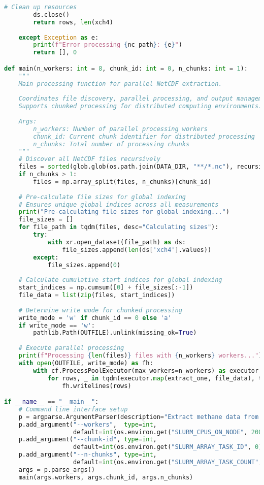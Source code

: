 \begin{lstlisting}[language=Python, caption=Parallel NetCDF Data Extraction Algorithm, label=alg:step01_extract, breaklines=true]
        # Clean up resources
        ds.close()
        return rows, len(xch4)
        
    except Exception as e:
        print(f"Error processing {nc_path}: {e}")
        return [], 0

def main(n_workers: int = 8, chunk_id: int = 0, n_chunks: int = 1):
    """
    Main processing function for parallel NetCDF extraction.
    
    Coordinates file discovery, parallel processing, and output management.
    Supports chunked processing for distributed computing environments.
    
    Args:
        n_workers: Number of parallel processing workers
        chunk_id: Current chunk identifier for distributed processing  
        n_chunks: Total number of processing chunks
    """
    # Discover all NetCDF files recursively
    files = sorted(glob.glob(os.path.join(DATA_DIR, "**/*.nc"), recursive=True))
    if n_chunks > 1:
        files = np.array_split(files, n_chunks)[chunk_id]
    
    # Pre-calculate file sizes for global indexing
    # Ensures unique global indices across all measurements
    print("Pre-calculating file sizes for global indexing...")
    file_sizes = []
    for file_path in tqdm(files, desc="Calculating sizes"):
        try:
            with xr.open_dataset(file_path) as ds:
                file_sizes.append(len(ds['xch4'].values))
        except:
            file_sizes.append(0)
    
    # Calculate cumulative start indices for global indexing
    start_indices = np.cumsum([0] + file_sizes[:-1])
    file_data = list(zip(files, start_indices))
    
    # Determine write mode for chunked processing
    write_mode = 'w' if chunk_id == 0 else 'a'
    if write_mode == 'w':
        pathlib.Path(OUTFILE).unlink(missing_ok=True)
    
    # Execute parallel processing
    print(f"Processing {len(files)} files with {n_workers} workers...")
    with open(OUTFILE, write_mode) as fh:
        with cf.ProcessPoolExecutor(max_workers=n_workers) as executor:
            for rows, _ in tqdm(executor.map(extract_one, file_data), total=len(files)):
                fh.writelines(rows)

if __name__ == "__main__":
    # Command line interface setup
    p = argparse.ArgumentParser(description="Extract methane data from NetCDF files")
    p.add_argument("--workers",  type=int, 
                   default=int(os.environ.get("SLURM_CPUS_ON_NODE", 200)))
    p.add_argument("--chunk-id", type=int, 
                   default=int(os.environ.get("SLURM_ARRAY_TASK_ID", 0)))
    p.add_argument("--n-chunks", type=int, 
                   default=int(os.environ.get("SLURM_ARRAY_TASK_COUNT", 1)))
    args = p.parse_args()
    main(args.workers, args.chunk_id, args.n_chunks)
\end{lstlisting}

